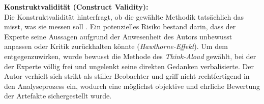 \textbf{Konstruktvalidität (Construct Validity):} \\
Die Konstruktvalidität hinterfragt, ob die gewählte Methodik tatsächlich das misst, was sie messen soll \parencite{runesonGuidelinesConductingReporting2009}. Ein potenzielles Risiko bestand darin, dass der Experte seine Aussagen aufgrund der Anwesenheit des Autors unbewusst anpassen oder Kritik zurückhalten könnte (\textit{Hawthorne-Effekt}). Um dem entgegenzuwirken, wurde bewusst die Methode des \textit{Think-Aloud} gewählt, bei der der Experte völlig frei und ungelenkt seine direkten Gedanken verbalisierte. Der Autor verhielt sich strikt als stiller Beobachter und griff nicht rechtfertigend in den Analyseprozess ein, wodurch eine möglichst objektive und ehrliche Bewertung der Artefakte sichergestellt wurde.